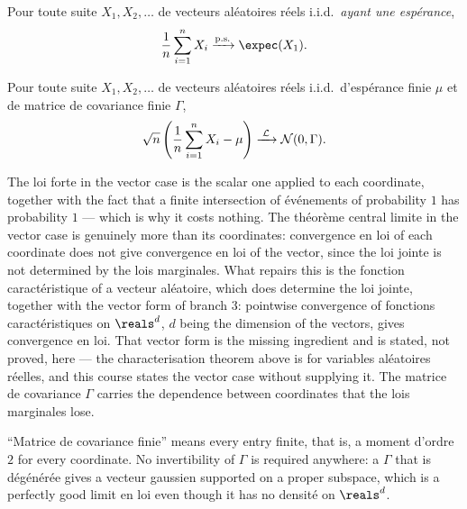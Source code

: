 \begin{theorem}
  Pour toute suite $X_{1}, X_{2}, \dots$ de vecteurs aléatoires réels
  i.i.d.\ \emph{ayant une espérance},
  \[
    \frac{1}{n} \sum_{i=1}^{n} X_{i} \cvas \expec(X_{1}) .
  \]
\end{theorem}

\begin{theorem}
  Pour toute suite $X_{1}, X_{2}, \dots$ de vecteurs aléatoires réels i.i.d.\
  d'espérance finie $\mu$ et de matrice de covariance finie $\Gamma$,
  \[
    \sqrt{n}\left(\frac{1}{n}\sum_{i=1}^{n} X_{i} - \mu\right)
      \xrightarrow{\;\mathcal{L}\;} \mathcal{N}(0, \Gamma) .
  \]
\end{theorem}

\begin{remark}
  The loi forte in the vector case is the scalar one applied to each
  coordinate, together with the fact that a finite intersection of événements
  of probability $1$ has probability $1$ --- which is why it costs nothing. The
  théorème central limite in the vector case is genuinely more than its
  coordinates: convergence en loi of each coordinate does not give convergence
  en loi of the vector, since the loi jointe is not determined by the lois
  marginales. What repairs this is the fonction caractéristique of a vecteur
  aléatoire, which does determine the loi jointe, together with the vector form
  of branch 3: pointwise convergence of fonctions caractéristiques on
  $\reals^{d}$, $d$ being the dimension of the vectors, gives convergence en
  loi. That vector form is the missing ingredient and is stated, not proved,
  here --- the characterisation theorem above is for variables aléatoires
  réelles, and this course states the vector case without supplying it. The
  matrice de covariance
  $\Gamma$ carries the dependence between coordinates that the lois marginales
  lose.
\end{remark}

\begin{remark}
  ``Matrice de covariance finie'' means every entry finite, that is, a moment
  d'ordre $2$ for every coordinate. No invertibility of $\Gamma$ is required
  anywhere: a $\Gamma$ that is dégénérée gives a vecteur gaussien supported on
  a proper subspace, which is a perfectly good limit en loi even though it has
  no densité on $\reals^{d}$.
\end{remark}

